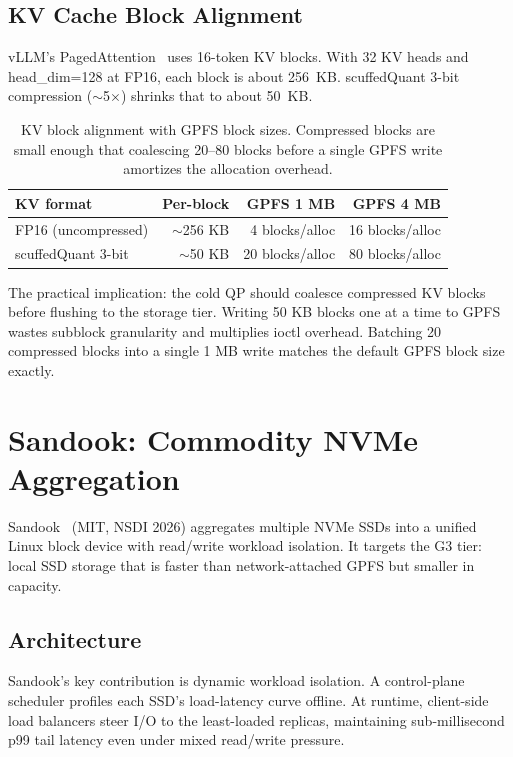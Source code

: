 \documentclass[11pt,letterpaper]{article}
\begin{document}
\subsection{KV Cache Block Alignment}

\noindent vLLM's PagedAttention~\cite{vllm_paged} uses 16-token KV blocks.
With 32 KV heads and head\_dim=128 at FP16, each block is about 256~KB.
scuffedQuant 3-bit compression ($\sim$5$\times$) shrinks that to about 50~KB.

\begin{table}[ht]
\centering\small
\begin{tabular}{lrrr}
\toprule
\textbf{KV format} & \textbf{Per-block} & \textbf{GPFS 1 MB} & \textbf{GPFS 4 MB} \\
\midrule
FP16 (uncompressed) & $\sim$256 KB & 4 blocks/alloc & 16 blocks/alloc \\
scuffedQuant 3-bit & $\sim$50 KB & 20 blocks/alloc & 80 blocks/alloc \\
\bottomrule
\end{tabular}
\caption{KV block alignment with GPFS block sizes. Compressed blocks are small enough that coalescing 20--80 blocks before a single GPFS write amortizes the allocation overhead.}
\label{tab:kv_alignment}
\end{table}

The practical implication: the cold QP should coalesce compressed KV blocks before flushing to the storage tier. Writing 50 KB blocks one at a time to GPFS wastes subblock granularity and multiplies ioctl overhead. Batching 20 compressed blocks into a single 1 MB write matches the default GPFS block size exactly.

\section{Sandook: Commodity NVMe Aggregation}

Sandook~\cite{sandook2026} (MIT, NSDI 2026) aggregates multiple NVMe SSDs into a unified Linux block device with read/write workload isolation. It targets the G3 tier: local SSD storage that is faster than network-attached GPFS but smaller in capacity.

\subsection{Architecture}

Sandook's key contribution is dynamic workload isolation. A control-plane scheduler profiles each SSD's load-latency curve offline. At runtime, client-side load balancers steer I/O to the least-loaded replicas, maintaining sub-millisecond p99 tail latency even under mixed read/write pressure.
\end{document}
